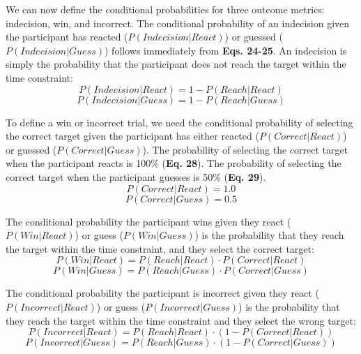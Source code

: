 \documentclass[12pt]{article}
\newcommand\boldblue[1]{\textcolor{mydarkblue}{\textbf{#1}}}
\begin{document}
We can now define the conditional probabilities for three outcome metrics: indecision, win, and incorrect. The conditional probability of an indecision given the participant has reacted ($P(Indecision|React)$) or guessed ($P(Indecision|Guess)$) follows immediately from \boldblue{Eqs. 24-25}. An indecision is simply the probability that the participant does not reach the target within the time constraint:
\begin{equation}
    P(Indecision|React) = 1 - P(Reach|React)
\end{equation}
\begin{equation}
    P(Indecision|Guess) = 1 - P(Reach|Guess)
\end{equation}

To define a win or incorrect trial, we need the conditional probability of selecting the correct target given the participant has either reacted ($P(Correct|React)$) or guessed ($P(Correct|Guess)$). The probability of selecting the correct target when the participant reacts is 100\% (\boldblue{Eq. 28}). The probability of selecting the correct target when the participant guesses is 50\% (\boldblue{Eq. 29}).
\begin{equation}
    P(Correct|React) = 1.0
\end{equation}
\begin{equation}
    P(Correct|Guess) = 0.5
\end{equation}

The conditional probability the participant wins given they react ($P(Win|React)$) or guess ($P(Win|Guess)$) is the probability that they reach the target within the time constraint, and they select the correct target:
\begin{equation}
    P(Win|React) = P(Reach|React) \cdot P(Correct|React)
\end{equation}
\begin{equation}
    P(Win|Guess) = P(Reach|Guess) \cdot P(Correct|Guess)
\end{equation}

The conditional probability the participant is incorrect given they react ($P(Incorrect|React)$) or guess ($P(Incorrect|Guess)$) is the probability that they reach the target within the time constraint and they select the wrong target:
\begin{equation}
    P(Incorrect|React) = P(Reach|React) \cdot (1 - P(Correct|React))
\end{equation}
\begin{equation}
    P(Incorrect|Guess) = P(Reach|Guess) \cdot (1 - P(Correct|Guess))
\end{equation}
\end{document}
